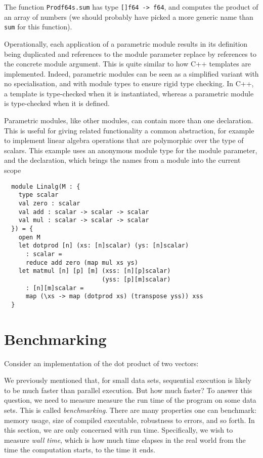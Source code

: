 \documentclass[oneside,11pt]{book}
\begin{document}
The function \texttt{Prodf64s.sum} has type \texttt{[]f64 -> f64}, and computes
the product of an array of numbers (we should probably have picked a
more generic name than \texttt{sum} for this function).

Operationally, each application of a parametric module results in
its definition being duplicated and references to the module parameter
replace by references to the concrete module argument.  This is quite
similar to how C++ templates are implemented.  Indeed, parametric
modules can be seen as a simplified variant with no specialisation,
and with module types to ensure rigid type checking.  In C++, a
template is type-checked when it is instantiated, whereas a
parametric module is type-checked when it is defined.

Parametric modules, like other modules, can contain more than one
declaration.  This is useful for giving related functionality a common
abstraction, for example to implement linear algebra operations that
are polymorphic over the type of scalars.  This example uses an
anonymous module type for the module parameter, and the 
declaration, which brings the names from a module into the current
scope

\begin{lstlisting}
  module Linalg(M : {
    type scalar
    val zero : scalar
    val add : scalar -> scalar -> scalar
    val mul : scalar -> scalar -> scalar
  }) = {
    open M
    let dotprod [n] (xs: [n]scalar) (ys: [n]scalar)
      : scalar =
      reduce add zero (map mul xs ys)
    let matmul [n] [p] [m] (xss: [n][p]scalar)
                           (yss: [p][m]scalar)
      : [n][m]scalar =
      map (\xs -> map (dotprod xs) (transpose yss)) xss
  }
\end{lstlisting}

\section{Benchmarking}
\label{sec:benchmarking}

Consider an implementation of the dot product of two vectors:



We previously mentioned that, for small data sets, sequential
execution is likely to be much faster than parallel execution.  But
how much faster?  To answer this question, we need to measure measure
the run time of the program on some data sets.  This is called
\textit{benchmarking}.  There are many properties one can benchmark:
memory usage, size of compiled executable, robustness to errors, and
so forth.  In this section, we are only concerned with run time.
Specifically, we wish to measure \textit{wall time}, which is how much
time elapses in the real world from the time the computation starts,
to the time it ends.
\end{document}
